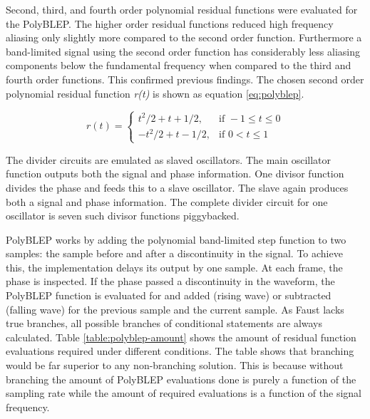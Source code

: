 \documentclass[11pt,a4paper]{article}
\begin{document}
Second, third, and fourth order polynomial residual functions were evaluated for the PolyBLEP. The higher order residual functions reduced high frequency aliasing only slightly more compared to the second order function. Furthermore a band-limited signal using the second order function has considerably less aliasing components below the fundamental frequency when compared to the third and fourth order functions. This confirmed previous findings\cite{pekonen}. The chosen second order polynomial residual function \emph{r(t)} is shown as equation \ref{eq:polyblep}.

\begin{equation}
\label{eq:polyblep}
r(t) = \begin{cases} 	t^2/2  + t + 1/2, & \mbox{if } -1 \leq t \leq 0\\ 
			-t^2/2 + t - 1/2, & \mbox{if } 0 < t \leq 1 \end{cases}
\end{equation}

The divider circuits are emulated as slaved oscillators. The main oscillator function outputs both the signal and phase information. One divisor function divides the phase and feeds this to a slave oscillator. The slave again produces both a signal and phase information. The complete divider circuit for one oscillator is seven such divisor functions piggybacked.

PolyBLEP works by adding the polynomial band-limited step function to two samples: the sample before and after a discontinuity in the signal. To achieve this, the implementation delays its output by one sample. At each frame, the phase is inspected. If the phase passed a discontinuity in the waveform, the PolyBLEP function is evaluated for and added (rising wave) or subtracted (falling wave) for the previous sample and the current sample. As Faust lacks true branches, all possible branches of conditional statements are always calculated. Table \ref{table:polyblep-amount} shows the amount of residual function evaluations required under different conditions. The table shows that branching would be far superior to any non-branching solution. This is because without branching the amount of PolyBLEP evaluations done is purely a function of the sampling rate while the amount of required evaluations is a function of the signal frequency. 
\end{document}
